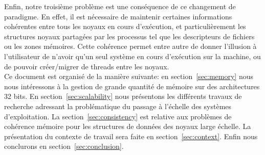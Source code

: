   Enfin, notre troisième problème est une conséquence de ce changement de
  paradigme. En effet, il est nécessaire de maintenir certaines informations
  cohérentes entre tous les noyaux en cours d'exécution, et particulièrement les
  structures noyaux partagées par les processus tel que les descripteurs de
  fichiers ou les zones mémoires. Cette cohérence permet entre autre de donner
  l'illusion à l'utilisateur de n'avoir qu'un seul système en cours d'exécution
  sur la machine, ou de pouvoir créer/migrer de threads entre les
  noyaux.\\

  \hspace{1cm}Ce document est organisé de la manière suivante: en
  section~\ref{sec:memory} nous nous intéressons à la gestion de grande quantité
  de mémoire sur des architectures 32 bits. En section~\ref{sec:scalability}
  nous présentons les différents travaux de recherche adressant la problématique
  du passage à l'échelle des systèmes d'exploitation.  La
  section~\ref{sec:consistency} est relative aux problèmes de cohérence mémoire
  pour les structures de données des noyaux large échelle. La présentation du
  contexte de travail sera faite en section~\ref{sec:context}. Enfin nous
  conclurons en section~\ref{sec:conclusion}.\newline
